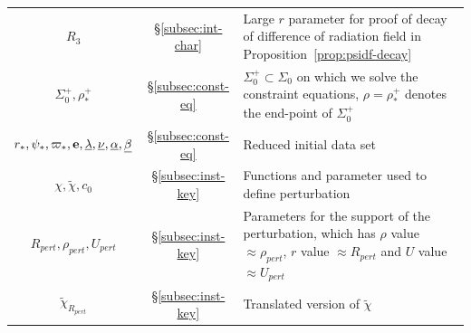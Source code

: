 \documentclass[10pt, reqno]{amsart}
\theoremstyle{definition}
\theoremstyle{remark}
\theoremstyle{conjecture}
\numberwithin{equation}{section}
\newcommand{\0}{\emptyset}
\newcommand{\alp}{\alpha}
\newcommand{\bt}{\beta}
\newcommand{\lmb}{\lambda}
\newcommand{\Sgm}{\Sigma}
\newcommand{\bfe}{{\bf e}}
\newcommand{\dur}{\nu}
\newcommand{\dvr}{\lmb}
\newcommand{\e}{\bfe}							%
\begin{document}
\begin{center}
\begin{tabular}{c  c p{25em}}
$R_3$ & \S \ref{subsec:int-char} & Large $r$ parameter for proof of decay of difference of radiation field in Proposition~\ref{prop:psidf-decay}\\
$\Sgm_{0}^{+}, \rho_{\ast}^{+}$ & \S \ref{subsec:const-eq} & $\Sgm_{0}^+\subset \Sgm_{0}$ on which we solve the constraint equations, $\rho=\rho_{\ast}^{+}$ denotes the end-point of $\Sgm_{0}^+$ \\
$r_{\ast}, \psi_{\ast}, \varpi_{\ast}, \e, \underline{\dvr}, \underline{\dur}, \underline{\alp}, \underline{\bt}$ & \S \ref{subsec:const-eq} & Reduced initial data set \\
$\chi, \tilde{\chi}, c_{0}$ & \S \ref{subsec:inst-key} & Functions and parameter used to define perturbation \\ 
$R_{pert}, \rho_{pert}, U_{pert}$ & \S \ref{subsec:inst-key} & Parameters for the support of the perturbation, which has $\rho$ value $\approx \rho_{pert}$, $r$ value $\approx R_{pert}$ and $U$ value $\approx U_{pert}$\\
$\tilde{\chi}_{R_{pert}}$ & \S \ref{subsec:inst-key} & Translated version of $\tilde{\chi}$
\end{tabular}
\end{center}




\end{document}
